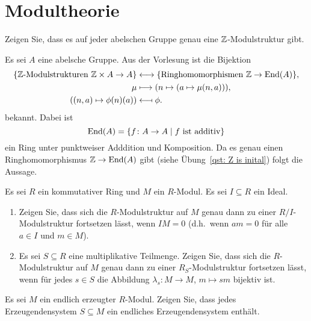 \section{Modultheorie}


\begin{question}
  Zeigen Sie, dass es auf jeder abelschen Gruppe genau eine $\mathbb{Z}$-Modulstruktur gibt.
\end{question}


\begin{solution}
  Es sei $A$ eine abelsche Gruppe.
  Aus der Vorlesung ist die Bijektion
  \begin{align*}
    \{\text{$\mathbb{Z}$-Modulstrukturen $\mathbb{Z} \times A \to A$}\}
    &\longleftrightarrow
    \{\text{Ringhomomorphismen $\mathbb{Z} \to \operatorname{End}(A)$}\},
    \\
                    \mu
    &\longmapsto    (n \mapsto (a \mapsto \mu(n,a))),
    \\
                    ( (n,a) \mapsto \phi(n)(a) )
    &\longmapsfrom  \phi.
  \end{align*}
  bekannt.
  Dabei ist
  \[
      \operatorname{End}(A)
    = \{f \colon A \to A \mid \text{$f$ ist additiv}\}
  \]
  ein Ring unter punktweiser Adddition und Komposition.
  Da es genau einen Ringhomomorphismus $\mathbb{Z} \to \operatorname{End}(A)$ gibt (siehe Übung~\ref{qst: Z is inital}) folgt die Aussage.
\end{solution}


\begin{question}
  Es sei $R$ ein kommutativer Ring und $M$ ein $R$-Modul.
  Es sei $I \subseteq R$ ein Ideal.
  \begin{enumerate}
    \item
      Zeigen Sie, dass sich die $R$-Modulstruktur auf $M$ genau dann zu einer $R/I$-Modulstruktur fortsetzen lässt, wenn $IM =  0$ (d.h.\ wenn $am = 0$ für alle $a \in I$ und $m \in M$).
    \item
      Es sei $S \subseteq R$ eine multiplikative Teilmenge.
      Zeigen Sie, dass sich die $R$-Modulstruktur auf $M$ genau dann zu einer $R_S$-Modulstruktur fortsetzen lässt, wenn für jedes $s \in S$ die Abbildung $\lambda_s \colon M \to M$, $m \mapsto sm$ bijektiv ist.
  \end{enumerate}
\end{question}




\begin{question}
  Es sei $M$ ein endlich erzeugter $R$-Modul.
  Zeigen Sie, dass jedes Erzeugendensystem $S \subseteq M$ ein endliches Erzeugendensystem enthält.
\end{question}


